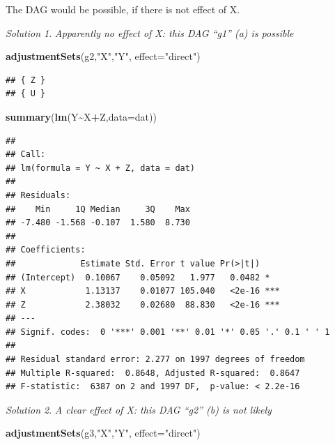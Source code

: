 \documentclass[
]{book}
\newenvironment{Shaded}{\begin{snugshade}}{\end{snugshade}}
\newcommand{\AttributeTok}[1]{\textcolor[rgb]{0.13,0.29,0.53}{#1}}
\newcommand{\FunctionTok}[1]{\textcolor[rgb]{0.13,0.29,0.53}{\textbf{#1}}}
\newcommand{\NormalTok}[1]{#1}
\newcommand{\SpecialCharTok}[1]{\textcolor[rgb]{0.81,0.36,0.00}{\textbf{#1}}}
\newcommand{\StringTok}[1]{\textcolor[rgb]{0.31,0.60,0.02}{#1}}
\theoremstyle{definition}
\theoremstyle{definition}
\theoremstyle{definition}
\theoremstyle{definition}
\theoremstyle{remark}
\newtheorem*{solution}{Solution}
\begin{document}
The DAG would be possible, if there is not effect of X.

\begin{solution}
\emph{Apparently no effect of X: this DAG ``g1'' (a) is possible}
\end{solution}

\begin{Shaded}
\begin{Highlighting}[]
\FunctionTok{adjustmentSets}\NormalTok{(g2,}\StringTok{"X"}\NormalTok{,}\StringTok{"Y"}\NormalTok{, }\AttributeTok{effect=}\StringTok{"direct"}\NormalTok{)}
\end{Highlighting}
\end{Shaded}

\begin{verbatim}
## { Z }
## { U }
\end{verbatim}

\begin{Shaded}
\begin{Highlighting}[]
\FunctionTok{summary}\NormalTok{(}\FunctionTok{lm}\NormalTok{(Y}\SpecialCharTok{\textasciitilde{}}\NormalTok{X}\SpecialCharTok{+}\NormalTok{Z,}\AttributeTok{data=}\NormalTok{dat))}
\end{Highlighting}
\end{Shaded}

\begin{verbatim}
## 
## Call:
## lm(formula = Y ~ X + Z, data = dat)
## 
## Residuals:
##    Min     1Q Median     3Q    Max 
## -7.480 -1.568 -0.107  1.580  8.730 
## 
## Coefficients:
##             Estimate Std. Error t value Pr(>|t|)    
## (Intercept)  0.10067    0.05092   1.977   0.0482 *  
## X            1.13137    0.01077 105.040   <2e-16 ***
## Z            2.38032    0.02680  88.830   <2e-16 ***
## ---
## Signif. codes:  0 '***' 0.001 '**' 0.01 '*' 0.05 '.' 0.1 ' ' 1
## 
## Residual standard error: 2.277 on 1997 degrees of freedom
## Multiple R-squared:  0.8648, Adjusted R-squared:  0.8647 
## F-statistic:  6387 on 2 and 1997 DF,  p-value: < 2.2e-16
\end{verbatim}

\begin{solution}
\emph{A clear effect of X: this DAG ``g2'' (b) is not likely}
\end{solution}

\begin{Shaded}
\begin{Highlighting}[]
\FunctionTok{adjustmentSets}\NormalTok{(g3,}\StringTok{"X"}\NormalTok{,}\StringTok{"Y"}\NormalTok{, }\AttributeTok{effect=}\StringTok{"direct"}\NormalTok{)}
\end{Highlighting}
\end{Shaded}
\end{document}
